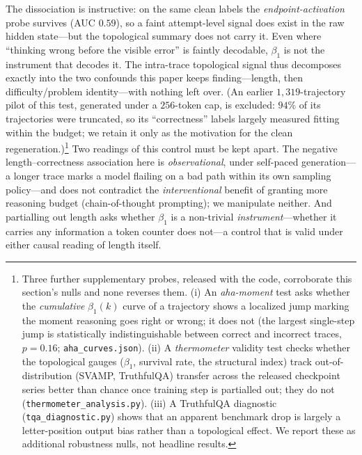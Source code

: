 \documentclass{article}
\begin{document}
The dissociation is instructive: on the same clean labels the \emph{endpoint-activation} probe
survives (AUC $0.59$), so a faint attempt-level signal does exist in the raw hidden state---but
the topological summary does not carry it. Even where ``thinking wrong before the visible error''
is faintly decodable, $\beta_1$ is not the instrument that decodes it. The intra-trace topological signal thus decomposes exactly into the two
confounds this paper keeps finding---length, then difficulty/problem identity---with nothing left
over. (An earlier $1{,}319$-trajectory pilot of this test, generated under a $256$-token cap, is
excluded: $94\%$ of its trajectories were truncated, so its ``correctness'' labels largely measured
fitting within the budget; we retain it only as the motivation for the clean regeneration.)\footnote{Three further supplementary probes, released with the code, corroborate this section's nulls and none reverses them. (i) An \emph{aha-moment} test asks whether the \emph{cumulative} $\beta_1(k)$ curve of a trajectory shows a localized jump marking the moment reasoning goes right or wrong; it does not (the largest single-step jump is statistically indistinguishable between correct and incorrect traces, $p = 0.16$; \texttt{aha\_curves.json}). (ii) A \emph{thermometer} validity test checks whether the topological gauges ($\beta_1$, survival rate, the structural index) track out-of-distribution (SVAMP, TruthfulQA) transfer across the released checkpoint series better than chance once training step is partialled out; they do not (\texttt{thermometer\_analysis.py}). (iii) A TruthfulQA diagnostic (\texttt{tqa\_diagnostic.py}) shows that an apparent benchmark drop is largely a letter-position output bias rather than a topological effect. We report these as additional robustness nulls, not headline results.}
Two readings of this control must be kept apart. The negative length--correctness association here
is \emph{observational}, under self-paced generation---a longer trace marks a model flailing on a
bad path within its own sampling policy---and does not contradict the \emph{interventional} benefit
of granting more reasoning budget (chain-of-thought prompting); we manipulate neither. And
partialling out length asks whether $\beta_1$ is a non-trivial \emph{instrument}---whether it
carries any information a token counter does not---a control that is valid under either causal
reading of length itself.
\end{document}
